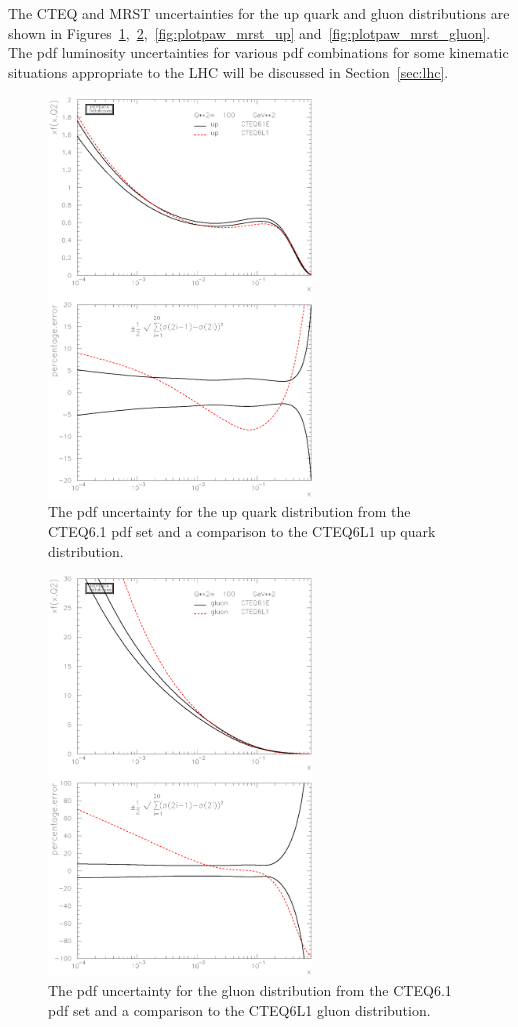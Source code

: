 \documentclass[12pt]{iopart}
\begin{document}
The CTEQ and MRST uncertainties for the up quark and gluon distributions are shown in
Figures~\ref{fig:plotpaw_up},~\ref{fig:plotpaw_gluon},~\ref{fig:plotpaw_mrst_up} and~\ref{fig:plotpaw_mrst_gluon}. The pdf
luminosity uncertainties for various pdf combinations for some kinematic situations appropriate to the LHC will be discussed in
Section~\ref{sec:lhc}. 
%
\begin{figure}[t]
\begin{center}
\includegraphics[width=7cm]{plotpaw_up.ps}
\end{center}
\caption{
The pdf uncertainty for the up quark distribution from the CTEQ6.1 pdf set and a comparison to the CTEQ6L1 up quark distribution. 
\label{fig:plotpaw_up}
}
\end{figure}
%

%
\begin{figure}[t]
\begin{center}
\includegraphics[width=7cm]{plotpaw_gluon.ps}
\end{center}
\caption{
The pdf uncertainty for the gluon distribution from the CTEQ6.1 pdf set and a comparison to the CTEQ6L1 gluon distribution. 
\label{fig:plotpaw_gluon}
}
\end{figure}
%
\end{document}
